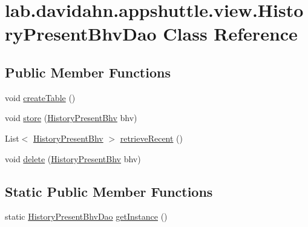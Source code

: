 \hypertarget{classlab_1_1davidahn_1_1appshuttle_1_1view_1_1_history_present_bhv_dao}{\section{lab.\-davidahn.\-appshuttle.\-view.\-History\-Present\-Bhv\-Dao \-Class \-Reference}
\label{classlab_1_1davidahn_1_1appshuttle_1_1view_1_1_history_present_bhv_dao}
}
\subsection*{\-Public \-Member \-Functions}
\begin{DoxyCompactItemize}
\item 
void \hyperlink{classlab_1_1davidahn_1_1appshuttle_1_1view_1_1_history_present_bhv_dao_ac9d93df933f90756ba8bd5711a69d8f7}{create\-Table} ()
\item 
void \hyperlink{classlab_1_1davidahn_1_1appshuttle_1_1view_1_1_history_present_bhv_dao_aac459e7f941c9d8b15742a33c8097670}{store} (\hyperlink{classlab_1_1davidahn_1_1appshuttle_1_1view_1_1_history_present_bhv}{\-History\-Present\-Bhv} bhv)
\item 
\-List$<$ \hyperlink{classlab_1_1davidahn_1_1appshuttle_1_1view_1_1_history_present_bhv}{\-History\-Present\-Bhv} $>$ \hyperlink{classlab_1_1davidahn_1_1appshuttle_1_1view_1_1_history_present_bhv_dao_a27e9e765af44214c4df1cca0c745a04c}{retrieve\-Recent} ()
\item 
void \hyperlink{classlab_1_1davidahn_1_1appshuttle_1_1view_1_1_history_present_bhv_dao_a2f9a7f8e51609987745d8640d8b19358}{delete} (\hyperlink{classlab_1_1davidahn_1_1appshuttle_1_1view_1_1_history_present_bhv}{\-History\-Present\-Bhv} bhv)
\end{DoxyCompactItemize}
\subsection*{\-Static \-Public \-Member \-Functions}
\begin{DoxyCompactItemize}
\item 
static \hyperlink{classlab_1_1davidahn_1_1appshuttle_1_1view_1_1_history_present_bhv_dao}{\-History\-Present\-Bhv\-Dao} \hyperlink{classlab_1_1davidahn_1_1appshuttle_1_1view_1_1_history_present_bhv_dao_a34b2ebd66c0da5c2dc8e4d7b74333d24}{get\-Instance} ()
\end{DoxyCompactItemize}


